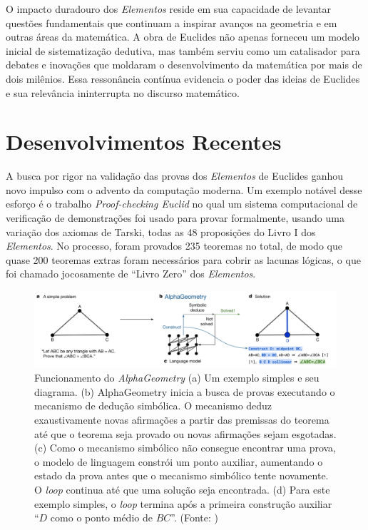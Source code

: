 \documentclass{hipatia}
\begin{document}

O impacto duradouro dos \emph{Elementos} reside em sua capacidade
de levantar questões fundamentais que continuam a inspirar
avanços na geometria e em outras áreas da matemática. A obra
de Euclides não apenas forneceu um modelo inicial de
sistematização dedutiva, mas também serviu como um
catalisador para debates e inovações que moldaram o
desenvolvimento da matemática por mais de dois milênios.
Essa ressonância contínua evidencia o poder das ideias de
Euclides e sua relevância ininterrupta no discurso
matemático.

\section{Desenvolvimentos Recentes}

A busca por rigor na validação das provas dos \emph{Elementos} de
Euclides ganhou novo impulso com o advento da computação
moderna.
Um exemplo notável desse esforço é 
o trabalho \emph{Proof-checking Euclid} \cite{beeson2019}
no qual um sistema computacional de verificação de 
demonstrações foi usado para provar 
formalmente, usando uma variação dos axiomas
de Tarski, todas as 48 proposições do Livro I
dos \emph{Elementos}. No processo, foram
provados 235 teoremas no total, de modo que
quase 200 teoremas extras foram necessários
para cobrir as lacunas lógicas, o que 
foi chamado jocosamente de 
``Livro Zero'' dos \emph{Elementos}. 

\begin{figure}[htb!]
\begin{center}
\includegraphics[width=17cm]{AlphaGeometry.png}
\end{center}
\caption{\label{fig:AlphaGeometry}
Funcionamento do \emph{AlphaGeometry}
(a) Um exemplo simples e seu diagrama. 
(b) AlphaGeometry inicia a busca de provas 
executando o mecanismo de dedução simbólica. 
O mecanismo deduz exaustivamente novas 
afirmações a partir das premissas do 
teorema até que o teorema seja provado 
ou novas afirmações sejam esgotadas. (c) 
Como o mecanismo simbólico não consegue 
encontrar uma prova, o modelo de 
linguagem constrói um ponto auxiliar, 
aumentando o estado da prova antes 
que o mecanismo simbólico tente novamente. 
O \emph{loop} continua até que uma solução seja 
encontrada. (d) Para este exemplo simples, 
o \emph{loop} termina após a primeira construção
 auxiliar ``$D$ como o ponto médio de $BC$''. 
(Fonte: \cite{trinh2024})}   
\end{figure}
\end{document}
